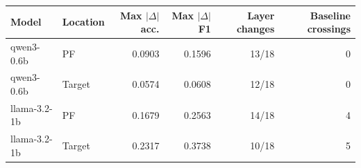 \begin{tabular}{llrrrr}
\toprule
Model & Location & Max $|\Delta|$ acc. & Max $|\Delta|$ F1 & Layer changes & Baseline crossings \\
\midrule
qwen3-0.6b & PF & 0.0903 & 0.1596 & 13/18 & 0 \\
qwen3-0.6b & Target & 0.0574 & 0.0608 & 12/18 & 0 \\
llama-3.2-1b & PF & 0.1679 & 0.2563 & 14/18 & 4 \\
llama-3.2-1b & Target & 0.2317 & 0.3738 & 10/18 & 5 \\
\bottomrule
\end{tabular}
